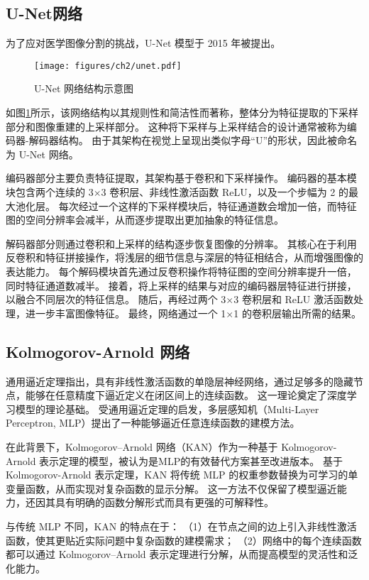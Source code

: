 \subsection{U-Net网络}
为了应对医学图像分割的挑战，U-Net 模型\cite{unet}于 2015 年被提出。
\begin{figure}
    \centering
    \texttt{[image: figures/ch2/unet.pdf]}
    \caption{U-Net 网络结构示意图}
    \label{img:unet}
\end{figure}

如图\ref{img:unet}所示，该网络结构以其规则性和简洁性而著称，整体分为特征提取的下采样部分和图像重建的上采样部分。
这种将下采样与上采样结合的设计通常被称为编码器-解码器结构。
由于其架构在视觉上呈现出类似字母“U”的形状，因此被命名为 U-Net 网络。

编码器部分主要负责特征提取，其架构基于卷积和下采样操作。
编码器的基本模块包含两个连续的 3×3 卷积层、非线性激活函数 ReLU，以及一个步幅为 2 的最大池化层。
每次经过一个这样的下采样模块后，特征通道数会增加一倍，而特征图的空间分辨率会减半，从而逐步提取出更加抽象的特征信息。

解码器部分则通过卷积和上采样的结构逐步恢复图像的分辨率。
其核心在于利用反卷积和特征拼接操作，将浅层的细节信息与深层的特征相结合，从而增强图像的表达能力。
每个解码模块首先通过反卷积操作将特征图的空间分辨率提升一倍，同时特征通道数减半。
接着，将上采样的结果与对应的编码器层特征进行拼接，以融合不同层次的特征信息。
随后，再经过两个 3×3 卷积层和 ReLU 激活函数处理，进一步丰富图像特征。
最终，网络通过一个 1×1 的卷积层输出所需的结果。

\subsection{Kolmogorov-Arnold 网络}
通用逼近定理\cite{universal_approximation}指出，具有非线性激活函数的单隐层神经网络，通过足够多的隐藏节点，能够在任意精度下逼近定义在闭区间上的连续函数。
这一理论奠定了深度学习模型的理论基础。
受通用逼近定理的启发，多层感知机（Multi-Layer Perceptron, MLP）\cite{mlp}提出了一种能够逼近任意连续函数的建模方法。

在此背景下，Kolmogorov–Arnold 网络（KAN）\cite{kan}作为一种基于 Kolmogorov-Arnold 表示定理\cite{kan_theorem}的模型，被认为是MLP的有效替代方案甚至改进版本。
基于Kolmogorov-Arnold 表示定理，KAN 将传统 MLP 的权重参数替换为可学习的单变量函数，从而实现对复杂函数的显示分解。
这一方法不仅保留了模型逼近能力，还因其具有明确的函数分解形式而具有更强的可解释性。

与传统 MLP 不同，KAN 的特点在于：
（1）在节点之间的边上引入非线性激活函数，使其更贴近实际问题中复杂函数的建模需求；
（2）网络中的每个连续函数都可以通过 Kolmogorov–Arnold 表示定理进行分解，从而提高模型的灵活性和泛化能力。

